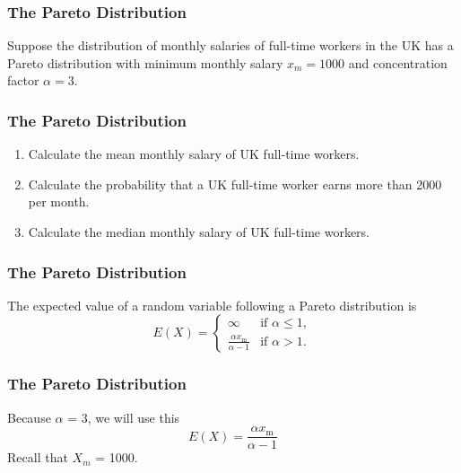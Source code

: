\documentclass[IntroMain.tex]{subfiles}
\begin{document}
\begin{frame}
\frametitle{The Pareto Distribution}
\Large
\vspace{-1.6cm}
Suppose the distribution of monthly salaries of full-time workers in the UK has
a Pareto distribution with minimum monthly salary $x_m = 1000$ and concentration
factor $\alpha = 3$. 

\end{frame}
\begin{frame}
	\frametitle{The Pareto Distribution}
	\Large
\begin{enumerate}
\item Calculate the mean monthly salary of UK full-time workers.
\item Calculate the probability that a UK full-time worker earns more than 2000 per month.
\item Calculate the median monthly salary of UK full-time workers.
\end{enumerate}
\end{frame}

\begin{frame}
\frametitle{The Pareto Distribution}
\Large
\vspace{-1.5cm}
The expected value of a random variable following a Pareto distribution is
\[E(X)= \begin{cases} \infty & \text{if }\alpha\le 1, \\ \frac{\alpha x_\mathrm{m}}{\alpha-1} & \text{if }\alpha>1. \end{cases}
\]

\end{frame}

\begin{frame}
	\frametitle{The Pareto Distribution}
	\Large
	\vspace{-2.5cm}
Because \textbf{$\alpha$} = $3$, we will use this
{
\LARGE
\[
E(X)= \frac{\alpha x_\mathrm{m}}{\alpha-1}   
\]
}
Recall that $X_m$ = 1000.
\end{frame}
\end{document}
